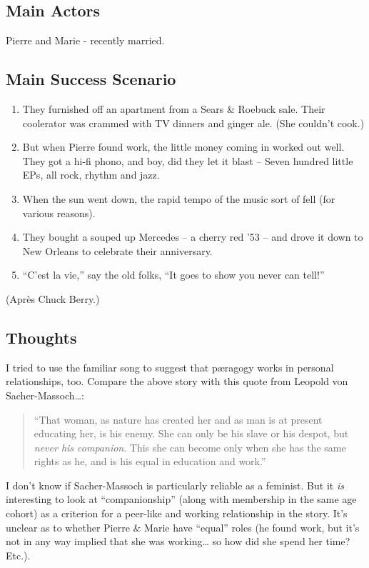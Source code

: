 \subsection{Main Actors}

Pierre and Marie - recently married.

\subsection{Main Success Scenario}

\begin{enumerate}
\item
  They furnished off an apartment from a Sears \& Roebuck sale. Their
  coolerator was crammed with TV dinners and ginger ale. (She couldn't
  cook.)
\item
  But when Pierre found work, the little money coming in worked out
  well. They got a hi-fi phono, and boy, did they let it blast -- Seven
  hundred little EPs, all rock, rhythm and jazz.
\item
  When the sun went down, the rapid tempo of the music sort of fell (for
  various reasons).
\item
  They bought a souped up Mercedes -- a cherry red '53 -- and drove it
  down to New Orleans to celebrate their anniversary.
\item
  ``C'est la vie,'' say the old folks, ``It goes to show you never can
  tell!''
\end{enumerate}
(Après Chuck Berry.)

\subsection{Thoughts}

I tried to use the familiar song to suggest that pæragogy works in
personal relationships, too. Compare the above story with this quote
from Leopold von Sacher-Massoch\ldots{}:

\begin{quote}
``That woman, as nature has created her and as man is at present
educating her, is his enemy. She can only be his slave or his despot,
but \emph{never his companion}. This she can become only when she has
the same rights as he, and is his equal in education and work.''

\end{quote}
I don't know if Sacher-Massoch is particularly reliable as a feminist.
But it \emph{is} interesting to look at ``companionship'' (along with
membership in the same age cohort) as a criterion for a peer-like and
working relationship in the story. It's unclear as to whether Pierre \&
Marie have ``equal'' roles (he found work, but it's not in any way
implied that she was working\ldots{} so how did she spend her time?
Etc.).

